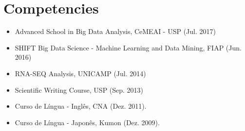 \documentclass[letterpaper]{twentysecondcv} %
\begin{document}
\section{Competencies}
\begin{itemize}
	\item Advanced School in Big Data Analysis, CeMEAI - USP (Jul. 2017)
	\item SHIFT Big Data Science - Machine Learning and Data Mining, FIAP (Jun. 2016)
	\item RNA-SEQ Analysis, UNICAMP (Jul. 2014)
	\item Scientific Writing Course, USP (Sep. 2013)
	\item Curso de Língua - Inglês, CNA (Dez. 2011).
	\item Curso de Língua - Japonês, Kumon (Dez. 2009).
\end{itemize}
\end{document}
